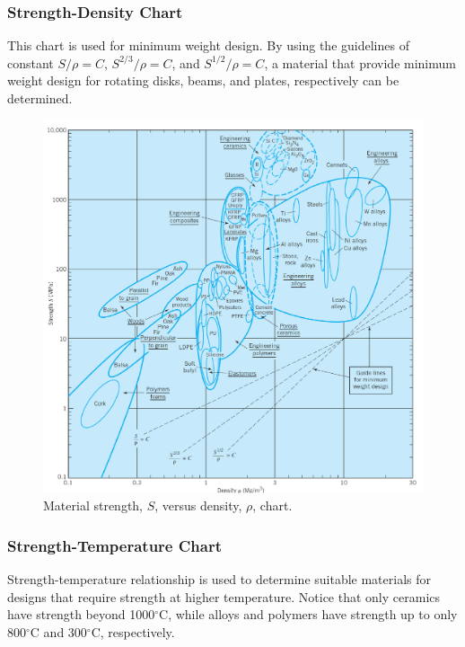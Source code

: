 \documentclass[
10pt,
a4paper,
openany,
svgnames,
]{book}
\begin{document}
\subsubsection{Strength-Density Chart} \label{subsub: strength-density}
This chart is used for minimum weight design. By using the guidelines of constant $S/\rho = C$, $S^{2/3}/\rho = C$, and $S^{1/2}/\rho = C$, a material that provide minimum weight design for rotating disks, beams, and plates, respectively can be determined.


\begin{figure}[h]
  \centering
  \includegraphics[scale=0.82]{pictures/Material-selection/strength-density-diagram}
  \caption{Material strength, $S$, versus density, $\rho$, chart. \cite{ashby2010materials}}
  \label{fig: strength density diagram}
\end{figure}

\subsubsection{Strength-Temperature Chart}

Strength-temperature relationship is used to determine suitable materials for designs that require strength at higher temperature. Notice that only ceramics have strength beyond 1000$^{\circ}$C, while alloys and polymers have strength up to only 800$^{\circ}$C and 300$^{\circ}$C, respectively.
\end{document}
